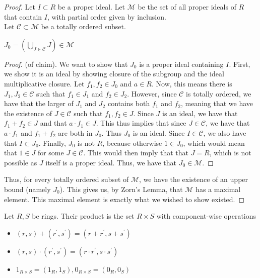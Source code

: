 \begin{proof}
    Let $I \subset R$ be a proper ideal. Let $\mathcal{M}$ be the set of all proper
    ideals of $R$ that contain $I$, with partial order given by inclusion. \\
    Let $\mathcal{C} \subset \mathcal{M}$ be a totally ordered subset.
    \begin{claim}
        $J_0 = \left(\bigcup\limits_{J \in \mathcal{C}}{J}\right) \in \mathcal{M}$
    \end{claim}
    \begin{proof} (of claim). We want to show that $J_0$ is a proper ideal containing
        $I$. First, we show it is an ideal by showing closure of the subgroup and the
        ideal multiplicative closure. Let $f_1, f_2 \in J_0$ and $a \in R$. Now, this means there
        is $J_1, J_2 \in \mathcal{C}$ such that $f_1 \in J_1$ and $f_2 \in J_2$. However,
        since $\mathcal{C}$ is totally ordered, we have that the larger of $J_1$ and $J_2$
        contains both $f_1$ and $f_2$, meaning that we have the existence of $J \in \mathcal{C}$
        such that $f_1,f_2 \in J$. Since $J$ is an ideal, we have that $f_1 + f_2 \in J$ and that
        $a \cdot f_1 \in J$. This thus implies that since $J \in \mathcal{C}$, we have that
        $a \cdot f_1$ and $f_1 + f_2$ are both in $J_0$. Thus $J_0$ is an ideal. Since $I \in \mathcal{C}$,
        we also have that $I \subset J_0$. Finally, $J_0$ is not $R$, because otherwise $1 \in J_0$,
        which would mean that $1 \in J$ for some $J \in \mathcal{C}$. This would then imply that
        that $J = R$, which is not possible as $J$ itself is a proper ideal. Thus, we have that $J_0 \in \mathcal{M}$.
    \end{proof}
    Thus, for every totally ordered subset of $\mathcal{M}$, we have the existence of an
    upper bound (namely $J_0$). This gives us, by Zorn's Lemma, that $\mathcal{M}$ has
    a maximal element. This maximal element is exactly what we wished to show existed.
\end{proof}
\begin{defn} \label{Defn 3, Jan 9}
Let $R,S$ be rings. Their product is the set $R \times S$ with component-wise
operations
\begin{itemize}
    \item $(r,s) + (r^\prime, s^\prime) = (r + r^\prime, s + s^\prime)$
    \item $(r,s) \cdot  (r^\prime, s^\prime) = (r \cdot r^\prime, s \cdot s^\prime)$
    \item $1_{R \times S} = (1_R, 1_S), 0_{R \times S} = (0_R, 0_S)$
\end{itemize}
\end{defn}

